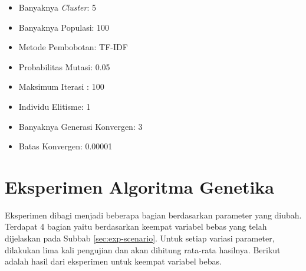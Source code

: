 \begin{itemize}
    \item Banyaknya \textit{Cluster}: 5
    \item Banyaknya Populasi: 100
    \item Metode Pembobotan: TF-IDF
    \item Probabilitas Mutasi: 0.05
    \item Maksimum Iterasi : 100
    \item Individu Elitisme: 1
    \item Banyaknya Generasi Konvergen: 3
	\item Batas Konvergen: 0.00001
\end{itemize}

\section{Eksperimen Algoritma Genetika}
\label{sec:experiment-ga}
Eksperimen dibagi menjadi beberapa bagian berdasarkan parameter yang diubah. Terdapat 4 bagian yaitu berdasarkan keempat variabel bebas yang telah dijelaskan pada Subbab \ref{sec:exp-scenario}. Untuk setiap variasi parameter, dilakukan lima kali pengujian dan akan dihitung rata-rata hasilnya. Berikut adalah hasil dari eksperimen untuk keempat variabel bebas.

